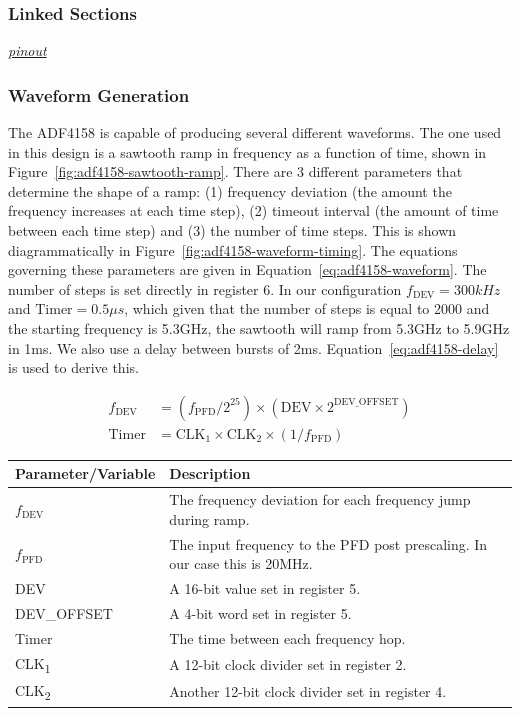 \subsubsection{Linked Sections}
\label{sec:adf4158-linked-sections}

\textit{\hyperref[sec:adf4158-pinout]{pinout}}

\subsubsection{Waveform Generation}
\label{sec:adf4158-waveform-generation}

The ADF4158 is capable of producing several different waveforms. The one used in this design is a
sawtooth ramp in frequency as a function of time, shown in
Figure~\ref{fig:adf4158-sawtooth-ramp}. There are 3 different parameters that determine the shape of
a ramp: (1) frequency deviation (the amount the frequency increases at each time step), (2) timeout
interval (the amount of time between each time step) and (3) the number of time steps. This is shown
diagrammatically in Figure~\ref{fig:adf4158-waveform-timing}. The equations governing these
parameters are given in Equation~\ref{eq:adf4158-waveform}. The number of steps is set directly in
register 6. In our configuration $f_{\text{DEV}} = 300\si{kHz}$ and $\text{Timer} = 0.5\si{\mu s}$,
which given that the number of steps is equal to 2000 and the starting frequency is 5.3GHz, the
sawtooth will ramp from 5.3GHz to 5.9GHz in 1ms. We also use a delay between bursts of
2ms. Equation~\ref{eq:adf4158-delay} is used to derive this.

\begin{align}
  f_{\text{DEV}} &= \left(f_{\text{PFD}}/2^{25}\right) \times \left(\text{DEV}\times
                   2^{\text{DEV\_OFFSET}}\right) \label{eq:adf4158-waveform} \\
  \text{Timer} &= \text{CLK}_1 \times \text{CLK}_2 \times \left(1/f_{\text{PFD}}\right) \nonumber
\end{align}

\label{tab:adf4158-waveform-equation-vars}
\begin{tabularx}{\textwidth}{l X>{\raggedright\arraybackslash}X}
        \toprule
        \textbf{Parameter/Variable} & \textbf{Description} \\
        \midrule

        $f_{\text{DEV}}$ & The frequency deviation for each frequency jump during ramp. \\
        $f_{\text{PFD}}$ & The input frequency to the PFD post prescaling. In our case this is 20MHz. \\
        DEV & A 16-bit value set in register 5. \\
        DEV\_OFFSET & A 4-bit word set in register 5. \\
        Timer & The time between each frequency hop. \\
        CLK\textsubscript{1} & A 12-bit clock divider set in register 2. \\
        CLK\textsubscript{2} & Another 12-bit clock divider set in register 4. \\

        \bottomrule
\end{tabularx}

